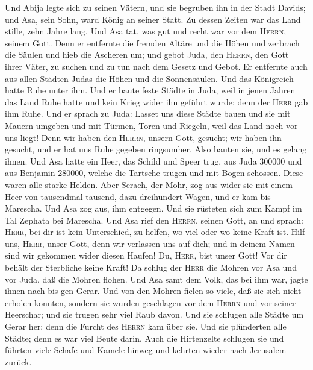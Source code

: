  Und Abija legte sich zu seinen Vätern, und sie begruben
ihn in der Stadt Davids; und Asa, sein Sohn, ward König an seiner Statt.
Zu dessen Zeiten war das Land stille, zehn Jahre lang. 
Und Asa tat, was gut und recht war vor dem \textsc{Herrn}, seinem Gott.
 Denn er entfernte die fremden Altäre und die Höhen und
zerbrach die Säulen und hieb die Ascheren um;  und gebot
Juda, den \textsc{Herrn}, den Gott ihrer Väter, zu suchen und zu tun
nach dem Gesetz und Gebot.  Er entfernte auch aus allen
Städten Judas die Höhen und die Sonnensäulen. Und das Königreich hatte
Ruhe unter ihm.  Und er baute feste Städte in Juda, weil
in jenen Jahren das Land Ruhe hatte und kein Krieg wider ihn geführt
wurde; denn der \textsc{Herr} gab ihm Ruhe.  Und er sprach
zu Juda: Lasset uns diese Städte bauen und sie mit Mauern umgeben und
mit Türmen, Toren und Riegeln, weil das Land noch vor uns liegt! Denn
wir haben den \textsc{Herrn}, unsern Gott, gesucht; wir haben ihn
gesucht, und er hat uns Ruhe gegeben ringsumher. Also bauten sie, und es
gelang ihnen.  Und Asa hatte ein Heer, das Schild und
Speer trug, aus Juda 300000 und aus Benjamin 280000, welche die Tartsche
trugen und mit Bogen schossen. Diese waren alle starke Helden.
 Aber Serach, der Mohr, zog aus wider sie mit einem Heer
von tausendmal tausend, dazu dreihundert Wagen, und er kam bis Marescha.
 Und Asa zog aus, ihm entgegen. Und sie rüsteten sich zum
Kampf im Tal Zephata bei Marescha.  Und Asa rief den
\textsc{Herrn}, seinen Gott, an und sprach: \textsc{Herr}, bei dir ist
kein Unterschied, zu helfen, wo viel oder wo keine Kraft ist. Hilf uns,
\textsc{Herr}, unser Gott, denn wir verlassen uns auf dich; und in
deinem Namen sind wir gekommen wider diesen Haufen! Du, \textsc{Herr},
bist unser Gott! Vor dir behält der Sterbliche keine Kraft!
 Da schlug der \textsc{Herr} die Mohren vor Asa und vor
Juda, daß die Mohren flohen.  Und Asa samt dem Volk, das
bei ihm war, jagte ihnen nach bis gen Gerar. Und von den Mohren fielen
so viele, daß sie sich nicht erholen konnten, sondern sie wurden
geschlagen vor dem \textsc{Herrn} und vor seiner Heerschar; und sie
trugen sehr viel Raub davon.  Und sie schlugen alle
Städte um Gerar her; denn die Furcht des \textsc{Herrn} kam über sie.
Und sie plünderten alle Städte; denn es war viel Beute darin.
 Auch die Hirtenzelte schlugen sie und führten viele
Schafe und Kamele hinweg und kehrten wieder nach Jerusalem zurück.

